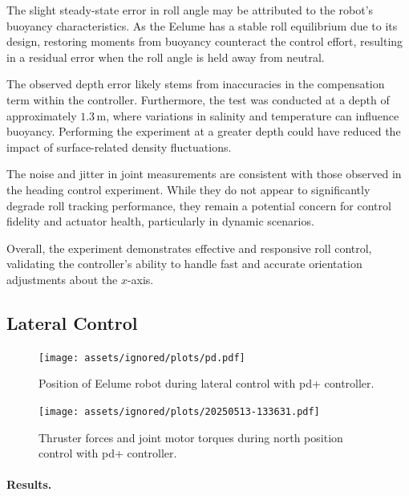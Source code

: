 The slight steady-state error in roll angle may be attributed to the robot’s 
buoyancy characteristics. As the Eelume has a stable roll equilibrium due to 
its design, restoring moments from buoyancy counteract the control effort, 
resulting in a residual error when the roll angle is held away from neutral.

The observed depth error likely stems from inaccuracies in the compensation 
term within the controller. Furthermore, the test was conducted at a depth of 
approximately \(1.3\,\mathrm{m}\), where variations in salinity and 
temperature can influence buoyancy. Performing the experiment at a greater 
depth could have reduced the impact of surface-related density fluctuations.

The noise and jitter in joint measurements are consistent with those observed 
in the heading control experiment. While they do not appear to significantly 
degrade roll tracking performance, they remain a potential concern for control 
fidelity and actuator health, particularly in dynamic scenarios.

Overall, the experiment demonstrates effective and responsive roll control, 
validating the controller’s ability to handle fast and accurate orientation 
adjustments about the \(x\)-axis.

\FloatBarrier


\subsection{Lateral Control}

\begin{figure}[!ht]
    \centering
    \texttt{[image: assets/ignored/plots/pd.pdf]}
    \caption{Position of Eelume robot during lateral control with \gls{pd+} controller.}
    \label{fig:results:dp_north:pos}
\end{figure}

\begin{figure}[!ht]
    \centering
    \texttt{[image: assets/ignored/plots/20250513-133631.pdf]}
    \caption{Thruster forces and joint motor torques during north position control with \gls{pd+} controller.}
    \label{fig:results:dp_north:forces}
\end{figure}

\paragraph{Results.}

